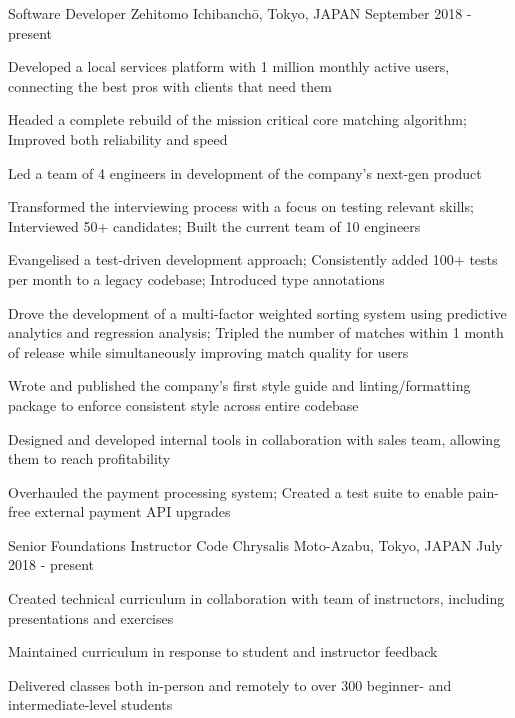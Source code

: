 
\begin{cventries}

  \cventry
  {Software Developer} %
  {Zehitomo} %
  {Ichibanchō, Tokyo, JAPAN} %
  {September 2018 - present} %
  {
    \begin{cvitems} %
      \item {Developed a local services platform with 1 million monthly active users, connecting the best pros with clients that need them}
      \item {Headed a complete rebuild of the mission critical core matching algorithm; Improved both reliability and speed}
      \item {Led a team of 4 engineers in development of the company's next-gen product}
      \item {Transformed the interviewing process with a focus on testing relevant skills; Interviewed 50+ candidates; Built the current team of 10 engineers}
      \item {Evangelised a test-driven development approach; Consistently added 100+ tests per month to a legacy codebase; Introduced type annotations}
      \item {Drove the development of a multi-factor weighted sorting system using predictive analytics and regression analysis; Tripled the number of matches within 1 month of release while simultaneously improving match quality for users}
      \item {Wrote and published the company's first style guide and linting/formatting package to enforce consistent style across entire codebase}
      \item {Designed and developed internal tools in collaboration with sales team, allowing them to reach profitability}
      \item {Overhauled the payment processing system; Created a test suite to enable pain-free external payment API upgrades}
    \end{cvitems}
  }

  \cventry
  {Senior Foundations Instructor} %
  {Code Chrysalis} %
  {Moto-Azabu, Tokyo, JAPAN} %
  {July 2018 - present} %
  {
    \begin{cvitems} %
      \item {Created technical curriculum in collaboration with team of instructors, including presentations and exercises}
      \item {Maintained curriculum in response to student and instructor feedback}
      \item {Delivered classes both in-person and remotely to over 300 beginner- and intermediate-level students}
    \end{cvitems}
  }


\end{cventries}
